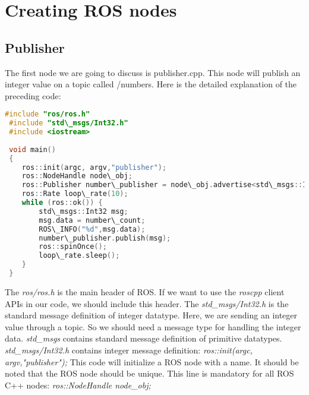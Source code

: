 \section{Creating ROS nodes}

\subsection{Publisher}
 The first node we are going to discuss is publisher.cpp.
 This node will publish an integer value on a topic called /numbers. Here is the detailed explanation of the preceding code:
 
\begin{lstlisting}[language=C++]
 #include "ros/ros.h"
 #include "std\_msgs/Int32.h"
 #include <iostream>
 
 void main()
 {
    ros::init(argc, argv,"publisher");
    ros::NodeHandle node\_obj;
    ros::Publisher number\_publisher = node\_obj.advertise<std\_msgs::Int32>("/numbers",10);
    ros::Rate loop\_rate(10);
    while (ros::ok()) {
        std\_msgs::Int32 msg;
        msg.data = number\_count;
        ROS\_INFO("%d",msg.data);
        number\_publisher.publish(msg);
        ros::spinOnce();
        loop\_rate.sleep();
    }
 }
 \end{lstlisting}
 
 The \textit{ros/ros.h} is the main header of ROS. If we want to use the \textit{roscpp} client APIs in our code, we should include this header. 
 The \textit{std\_msgs/Int32.h} is the standard message definition of integer datatype.
 Here, we are sending an integer value through a topic. So we should need a message type for handling the integer data. \textit{std\_msgs} contains standard message definition of primitive datatypes. \textit{std\_msgs/Int32.h} contains integer message definition: \textit{ros::init(argc, argv,"publisher");} This code will initialize a ROS node with a name. It should be noted that the ROS node should be unique. This line is mandatory for all ROS C++ nodes: \textit{ros::NodeHandle node\_obj;}
 
